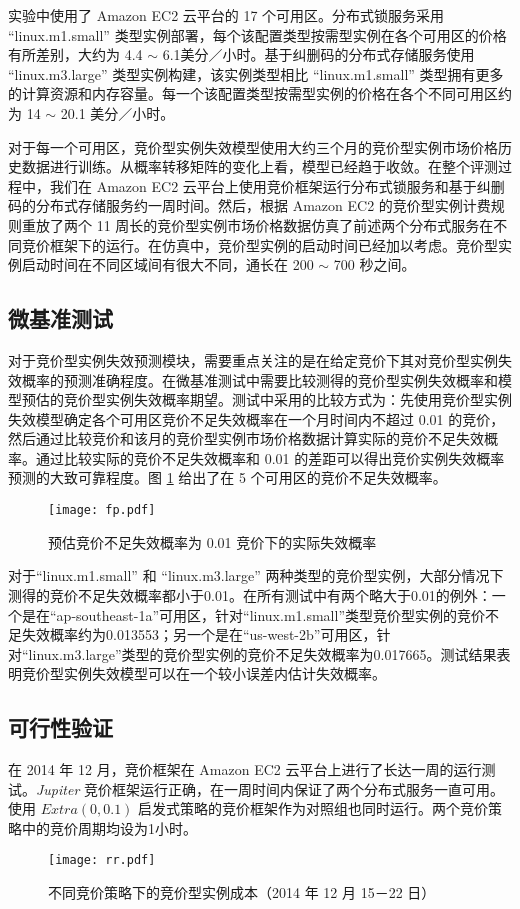 实验中使用了 Amazon EC2 云平台的 17 个可用区。分布式锁服务采用 ``linux.m1.small'' 类型实例部署，每个该配置类型按需型实例在各个可用区的价格有所差别，大约为 4.4 $\sim$ 6.1美分／小时。基于纠删码的分布式存储服务使用 ``linux.m3.large'' 类型实例构建，该实例类型相比 ``linux.m1.small'' 类型拥有更多的计算资源和内存容量。每一个该配置类型按需型实例的价格在各个不同可用区约为 14 $\sim$ 20.1 美分／小时。

对于每一个可用区，竞价型实例失效模型使用大约三个月的竞价型实例市场价格历史数据进行训练。从概率转移矩阵的变化上看，模型已经趋于收敛。在整个评测过程中，我们在 Amazon EC2 云平台上使用竞价框架运行分布式锁服务和基于纠删码的分布式存储服务约一周时间。然后，根据 Amazon EC2 的竞价型实例计费规则重放了两个 11 周长的竞价型实例市场价格数据仿真了前述两个分布式服务在不同竞价框架下的运行。在仿真中，竞价型实例的启动时间已经加以考虑。竞价型实例启动时间在不同区域间有很大不同，通长在 200 $\sim$ 700 秒之间\cite{Mao:2012:PSV:2353730.2353859}。

\subsection{微基准测试}
对于竞价型实例失效预测模块，需要重点关注的是在给定竞价下其对竞价型实例失效概率的预测准确程度。在微基准测试中需要比较测得的竞价型实例失效概率和模型预估的竞价型实例失效概率期望。测试中采用的比较方式为：先使用竞价型实例失效模型确定各个可用区竞价不足失效概率在一个月时间内不超过 0.01 的竞价，然后通过比较竞价和该月的竞价型实例市场价格数据计算实际的竞价不足失效概率。通过比较实际的竞价不足失效概率和 0.01 的差距可以得出竞价实例失效概率预测的大致可靠程度。图 \ref{figure:fp} 给出了在 5 个可用区的竞价不足失效概率。
\begin{figure}
  \centering
  \texttt{[image: fp.pdf]}
  \caption{预估竞价不足失效概率为 0.01 竞价下的实际失效概率}
  \label{figure:fp}
\end{figure}

对于``linux.m1.small'' 和 ``linux.m3.large'' 两种类型的竞价型实例，大部分情况下测得的竞价不足失效概率都小于0.01。在所有测试中有两个略大于0.01的例外：一个是在``ap-southeast-1a''可用区，针对``linux.m1.small''类型竞价型实例的竞价不足失效概率约为0.013553；另一个是在``us-west-2b''可用区，针对``linux.m3.large''类型的竞价型实例的竞价不足失效概率为0.017665。测试结果表明竞价型实例失效模型可以在一个较小误差内估计失效概率。

\subsection{可行性验证}
在 2014 年 12 月，竞价框架在 Amazon EC2 云平台上进行了长达一周的运行测试。\emph{Jupiter} 竞价框架运行正确，在一周时间内保证了两个分布式服务一直可用。使用 $Extra(0, 0.1)$ 启发式策略的竞价框架作为对照组也同时运行。两个竞价策略中的竞价周期均设为1小时。
\begin{figure}
  \centering
  \texttt{[image: rr.pdf]}
  \caption{不同竞价策略下的竞价型实例成本（2014 年 12 月 15－22 日）}
  \label{figure:rr}
\end{figure}

